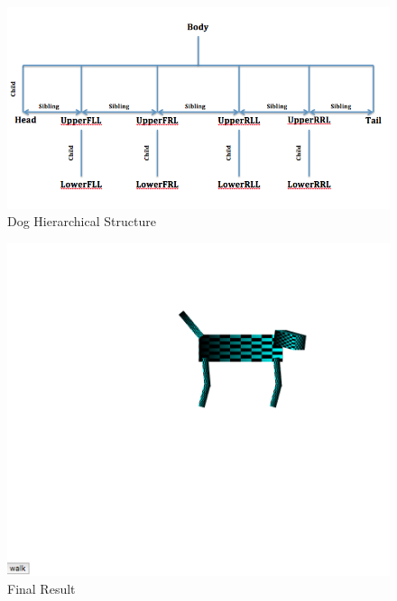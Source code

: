 \documentclass{article}
\begin{document}
\begin{enumerate}
\begin{figure}[!ht]
\centering
\includegraphics[scale=0.50]{HW1}
\caption{Dog Hierarchical Structure}
\label{fig:fig1}
\end{figure}

\begin{figure}[!ht]
\centering
\includegraphics[scale=0.50]{HW2}
\caption{Final Result}
\label{fig:fig1}
\end{figure}




\end{enumerate}
\end{document}
